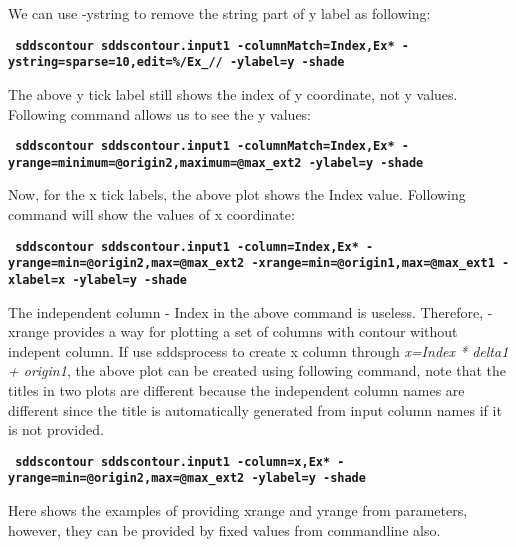 \begin{itemize}
\begin{itemize}
        We can use -ystring to remove the string part of y label as following:
        \begin{flushleft}{\tt \bf
            sddscontour sddscontour.input1 -columnMatch=Index,Ex* -ystring=sparse=10,edit=\%/Ex\_// -ylabel=y -shade    
        }\end{flushleft}

        The above y tick label still shows the index of y coordinate, not y values. Following command allows us to see the y values:
        \begin{flushleft}{\tt \bf
            sddscontour sddscontour.input1 -columnMatch=Index,Ex* -yrange=minimum=@origin2,maximum=@max\_ext2 -ylabel=y -shade          
        }\end{flushleft}

        Now, for the x tick labels, the above plot shows the Index value. Following command will show the values of x coordinate:
    
        \begin{flushleft}{\tt \bf
        sddscontour sddscontour.input1 -column=Index,Ex* -yrange=min=@origin2,max=@max\_ext2 -xrange=min=@origin1,max=@max\_ext1 -xlabel=x -ylabel=y  -shade   
        }\end{flushleft}  
        
        The independent column - Index in the above command is useless. Therefore, -xrange provides a way for plotting a set of columns with contour without indepent column. If use sddsprocess to create x column through {\em x=Index * delta1 + origin1}, the above plot can be created using following command, note that the titles in two plots are different because the independent column names are different since the title is automatically generated from input column names if it is not provided.

        \begin{flushleft}{\tt \bf
        sddscontour sddscontour.input1 -column=x,Ex* -yrange=min=@origin2,max=@max\_ext2 -ylabel=y -shade   
        }\end{flushleft}  


       Here shows the examples of providing xrange and yrange from parameters, however, they can be provided by fixed values from commandline also.


\end{itemize}
\end{itemize}
